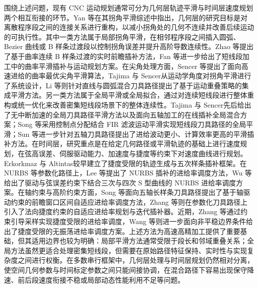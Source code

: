 \documentclass[preprint,12pt]{elsarticle}
\begin{document}
围绕上述问题，现有 CNC 运动规划通常可分为几何层轨迹平滑与时间层速度规划两个相互衔接的环节。Yan 等\cite{Yan2023}在其拐角平滑综述中指出，几何层的研究目标是对离散程序段之间的连接关系进行重构，以减小拐角处的几何不连续并改善后续运动的可执行性。其中一类方法属于局部拐角平滑，在相邻程序段之间插入圆弧、Bezier 曲线或 B 样条过渡段以控制拐角误差并提升高阶导数连续性。Zhao 等\cite{Zhao2013}提出了基于曲率连续 B 样条过渡的实时前瞻插补方法，Fan 等\cite{Fan2015}进一步给出了短线段加工中的曲率平滑插补与运动规划方案。在尖角处理方面，Sencer 等\cite{Sencer2015}提出了面向高速进给的曲率最优尖角平滑算法，Tajima 与 Sencer\cite{Tajima2016}从运动学角度对拐角平滑进行了系统设计，Li 等\cite{Li2023}则针对直线与圆弧混合刀具路径提出了基于运动重叠策略的集成平滑方法。另一类方法属于全局平滑或全局拟合，通过对连续短线段进行整体重构或统一优化来改善密集短线段场景下的整体连续性。Tajima 与 Sencer\cite{Tajima2017,Tajima2022}先后给出了无中断加速的全局刀具路径平滑方法以及面向五轴加工的在线插补全局混合方案；Song 等\cite{Song2021}采用控制点分配结合 FIR 滤波运动平滑实现短线段刀具路径的全局平滑；Sun 等\cite{Sun2024}进一步针对五轴刀具路径提出了进给波动更小、计算效率更高的平滑插补方法。在时间层，研究重点是在给定几何路径或平滑轨迹的基础上进行速度规划，在弦高误差、伺服驱动能力、加速度与捷度等约束下对速度曲线进行规划。Erkorkmaz 与 Altintas\cite{Erkorkmaz2001}较早建立了捷度受限的轨迹生成与五次样条插补框架。在 NURBS 等参数化路径上，Lee 等\cite{Lee2011}提出了 NURBS 插补的进给率调度方法，Wu 等\cite{Wu2022}给出了驱动与弦误差约束下结合三次与四次 S 型曲线的 NURBS 进给率调度方案。在轴约束与高阶约束方面，Song 等\cite{Song2020}面向五轴长样条刀具路径提出了基于轴驱动约束的前瞻窗口区间自适应进给率调度方法，Zhang 等\cite{Zhang2021}则在参数化刀具路径上引入了法向捷度约束的自适应进给率规划与迭代插补器。近期，Zhang 等\cite{Zhang2026}通过约束引导采样实现捷度受限的进给率调度，Wang 等\cite{Wang2025b}则进一步面向非平稳边界条件给出了捷度受限的无振荡进给率调度方案。上述方法为高速高精加工提供了重要基础，但其适用边界也较为明确：局部平滑方法通常受限于段长和邻域重叠关系\cite{Zhao2013,Tajima2016,Li2023}；全局方法虽然更适合处理密集短线段，但需要在原始路径特征保持、实时性与实现复杂度之间进行权衡\cite{Tajima2017,Song2021}。在多数串行框架中，几何层处理与时间层规划仍然相对分离，使空间几何参数与时间标定参数之间只能间接协调，在混合路径下容易出现保守降速、前后段速度衔接不稳或局部动态性能利用不足等问题\cite{Yan2023,Wang2025}。
\end{document}
